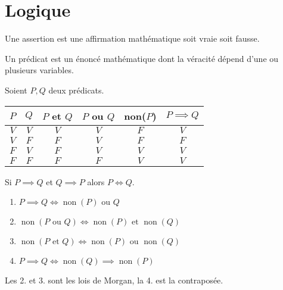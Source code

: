 \chapter{Logique}
\begin{definition}[Assertion]
  Une assertion est une affirmation mathématique soit vraie soit fausse.
\end{definition}

\begin{definition}[Prédicat]
  Un prédicat est un énoncé mathématique dont la véracité dépend d'une ou plusieurs variables.
\end{definition}

\begin{proposition}
  Soient $P, Q$ deux prédicats.
  \begin{table}[!h]
    \centering
    \begin{tabular}{cccccc}
      \toprule
      $P$ & $Q$ & $P$ et $Q$ & $P$ ou $Q$ & non($P$) & $P \implies Q$ \\
      \midrule
      $V$ & $V$ & $V$ & $V$ & $F$ & $V$ \\
      $V$ & $F$ & $F$ & $V$ & $F$ & $F$ \\
      $F$ & $V$ & $F$ & $V$ & $V$ & $V$ \\
      $F$ & $F$ & $F$ & $F$ & $V$ & $V$ \\
      \bottomrule
    \end{tabular}
  \end{table}
  
  \noindent Si $P \implies Q$ et $Q \implies P$ alors $P \iff Q$.
  \begin{multicols}{2}
    \begin{enumerate} 
    \item $P \implies Q \iff \operatorname{non}(P) \text{ ou } Q$
    \item $\operatorname{non}(P \text{ ou } Q) \iff \operatorname{non}(P) \text{ et } \operatorname{non}(Q)$
    \item $\operatorname{non}(P \text{ et } Q) \iff \operatorname{non}(P) \text{ ou } \operatorname{non}(Q)$
    \item $P \implies Q \iff \operatorname{non}(Q) \implies \operatorname{non}(P)$
  \end{enumerate}
  \end{multicols}
\end{proposition}

\begin{remark}
    Les 2. et 3. sont les lois de Morgan, la 4. est la contraposée.
\end{remark}

